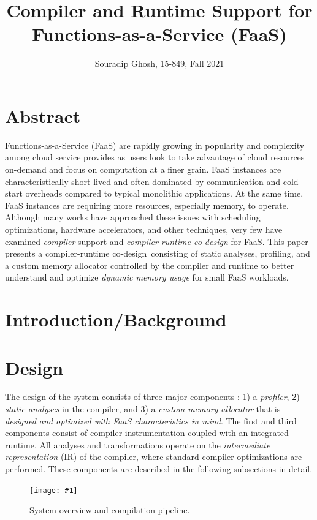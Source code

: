 \documentclass{article}
\title{Compiler and Runtime Support for Functions-as-a-Service (FaaS)}
\date{}
\author{Souradip Ghosh, 15-849, Fall 2021}
\def\pagefig#1{\texttt{[image: \#1]}}
\def\crcd{compiler-runtime co-design}
\begin{document}
\maketitle

\section{Abstract}
Functions-as-a-Service (FaaS) are rapidly growing in popularity and 
complexity among cloud service provides as users look to take 
advantage of cloud resources on-demand and focus on computation
at a finer grain. FaaS instances are characteristically short-lived
and often dominated by communication and cold-start overheads compared
to typical monolithic applications. At the same time, FaaS instances
are requiring more resources, especially memory, to operate. Although
many works have approached these issues with scheduling optimizations,
hardware accelerators, and other techniques, very few have examined
\textit{compiler} support and \textit{\crcd} for FaaS. This paper presents 
a \crcd\ consisting of static analyses, profiling, and a custom memory 
allocator controlled by the compiler and runtime to better understand 
and optimize \textit{dynamic memory usage} for small FaaS workloads.

\section{Introduction/Background}

\section{Design}
The design of the system consists of three major components : 1) a \textit{profiler},
2) \textit{static analyses} in the compiler, and 3) a \textit{custom memory allocator}
that is \textit{designed and optimized with FaaS characteristics in mind}. The first and third components consist 
of compiler instrumentation coupled with an integrated runtime. All analyses and 
transformations operate on the \textit{intermediate representation} (IR) of the compiler, 
where standard compiler optimizations are performed. These components are described in 
the following subsections in detail. 

\begin{figure}[htp]
    \centerline{\pagefig{figs/sys.pdf}}
    \caption{System overview and compilation pipeline. }  
	\label{fig:sys}
\end{figure}
\end{document}
